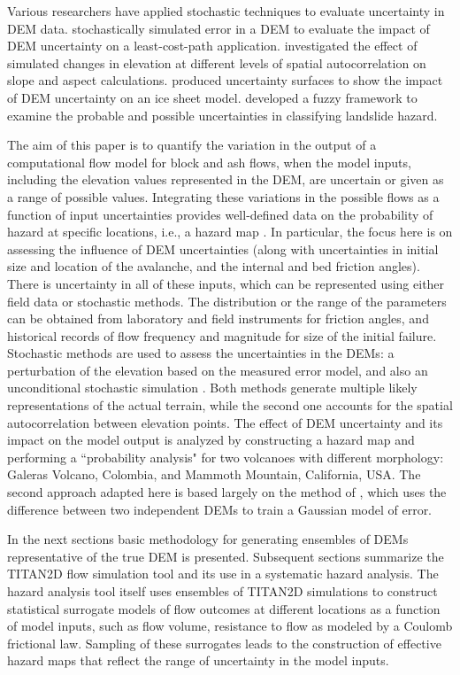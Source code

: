 \documentclass[12pt]{article}
\begin{document}
Various researchers have applied stochastic techniques to evaluate
uncertainty in DEM data. \citet{Ehlschlaeger_1996} stochastically
simulated error in a DEM to evaluate the impact of DEM uncertainty on
a least-cost-path application. \citet{Hunter_Goodchild_1997}
investigated the effect of simulated changes in elevation at different
levels of spatial autocorrelation on slope and aspect
calculations. \citet{Felix_Hebeler} produced uncertainty surfaces to
show the impact of DEM uncertainty on an ice sheet
model. \citet{Amii_Darnell} developed a fuzzy framework to examine the
probable and possible uncertainties in classifying landslide hazard.

The aim of this paper is to quantify the variation in the output of a
computational flow model for block and ash flows, when the model
inputs, including the elevation values represented in the DEM, are
uncertain or given as a range of possible values. Integrating these
variations in the possible flows as a function of input uncertainties
provides well-defined data on the probability of hazard at
specific locations, i.e., a hazard map \citep{Keith}.  In particular,
the focus here is on assessing the influence of DEM uncertainties (along with
uncertainties in initial size and location of the avalanche, and the
internal and bed friction angles).  There is uncertainty in all of
these inputs, which can be represented using either field data or
stochastic methods.  The distribution or the range of the parameters
can be obtained from laboratory and field instruments for friction
angles, and historical records of flow frequency and magnitude for
size of the initial failure.  Stochastic methods are used to assess
the uncertainties in the DEMs: a perturbation of the elevation based
on the measured error model, and also an unconditional stochastic
simulation \citep{Ehlschlaeger_1996}.  Both methods generate multiple
likely representations of the actual terrain, while the second one
accounts for the spatial autocorrelation between elevation points.
The effect of DEM uncertainty and its impact on the model output is
analyzed by constructing a hazard map and performing a ``probability
analysis" for two volcanoes with different morphology: Galeras
Volcano, Colombia, and Mammoth Mountain, California, USA.  
The second approach adapted here is based largely on the method of \citet{Ehlschlaeger_1996},
which uses the difference between two independent DEMs to train a
Gaussian model of error.

In the next sections basic methodology for generating
ensembles of DEMs representative of the true DEM is presented.  Subsequent sections
summarize the TITAN2D flow simulation tool and its use in a systematic
hazard analysis. The hazard analysis tool itself uses ensembles of
TITAN2D simulations to construct statistical surrogate models of flow
outcomes at different locations as a function of model inputs, such as
flow volume, resistance to flow as modeled by a Coulomb frictional
law.  Sampling of these surrogates leads to the construction of
effective hazard maps that reflect the range of uncertainty in the
model inputs.
\end{document}
